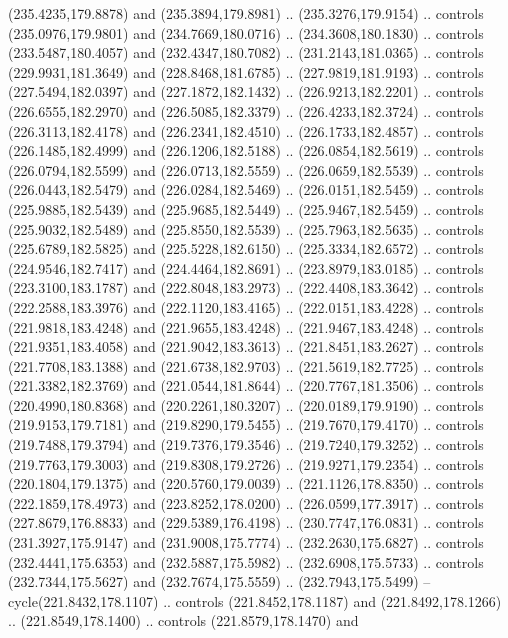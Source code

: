 \begin{scope}[cm={{1.25,0.0,0.0,-1.25,(0.0,442.91375)}}]
    (235.4235,179.8878) and (235.3894,179.8981) .. (235.3276,179.9154) .. controls
    (235.0976,179.9801) and (234.7669,180.0716) .. (234.3608,180.1830) .. controls
    (233.5487,180.4057) and (232.4347,180.7082) .. (231.2143,181.0365) .. controls
    (229.9931,181.3649) and (228.8468,181.6785) .. (227.9819,181.9193) .. controls
    (227.5494,182.0397) and (227.1872,182.1432) .. (226.9213,182.2201) .. controls
    (226.6555,182.2970) and (226.5085,182.3379) .. (226.4233,182.3724) .. controls
    (226.3113,182.4178) and (226.2341,182.4510) .. (226.1733,182.4857) .. controls
    (226.1485,182.4999) and (226.1206,182.5188) .. (226.0854,182.5619) .. controls
    (226.0794,182.5599) and (226.0713,182.5559) .. (226.0659,182.5539) .. controls
    (226.0443,182.5479) and (226.0284,182.5469) .. (226.0151,182.5459) .. controls
    (225.9885,182.5439) and (225.9685,182.5449) .. (225.9467,182.5459) .. controls
    (225.9032,182.5489) and (225.8550,182.5539) .. (225.7963,182.5635) .. controls
    (225.6789,182.5825) and (225.5228,182.6150) .. (225.3334,182.6572) .. controls
    (224.9546,182.7417) and (224.4464,182.8691) .. (223.8979,183.0185) .. controls
    (223.3100,183.1787) and (222.8048,183.2973) .. (222.4408,183.3642) .. controls
    (222.2588,183.3976) and (222.1120,183.4165) .. (222.0151,183.4228) .. controls
    (221.9818,183.4248) and (221.9655,183.4248) .. (221.9467,183.4248) .. controls
    (221.9351,183.4058) and (221.9042,183.3613) .. (221.8451,183.2627) .. controls
    (221.7708,183.1388) and (221.6738,182.9703) .. (221.5619,182.7725) .. controls
    (221.3382,182.3769) and (221.0544,181.8644) .. (220.7767,181.3506) .. controls
    (220.4990,180.8368) and (220.2261,180.3207) .. (220.0189,179.9190) .. controls
    (219.9153,179.7181) and (219.8290,179.5455) .. (219.7670,179.4170) .. controls
    (219.7488,179.3794) and (219.7376,179.3546) .. (219.7240,179.3252) .. controls
    (219.7763,179.3003) and (219.8308,179.2726) .. (219.9271,179.2354) .. controls
    (220.1804,179.1375) and (220.5760,179.0039) .. (221.1126,178.8350) .. controls
    (222.1859,178.4973) and (223.8252,178.0200) .. (226.0599,177.3917) .. controls
    (227.8679,176.8833) and (229.5389,176.4198) .. (230.7747,176.0831) .. controls
    (231.3927,175.9147) and (231.9008,175.7774) .. (232.2630,175.6827) .. controls
    (232.4441,175.6353) and (232.5887,175.5982) .. (232.6908,175.5733) .. controls
    (232.7344,175.5627) and (232.7674,175.5559) .. (232.7943,175.5499) --
    cycle(221.8432,178.1107) .. controls (221.8452,178.1187) and
    (221.8492,178.1266) .. (221.8549,178.1400) .. controls (221.8579,178.1470) and

\end{scope}
